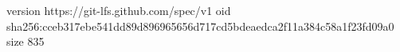 version https://git-lfs.github.com/spec/v1
oid sha256:cceb317ebe541dd89d896965656d717cd5bdeaedca2f11a384c58a1f23fd09a0
size 835
